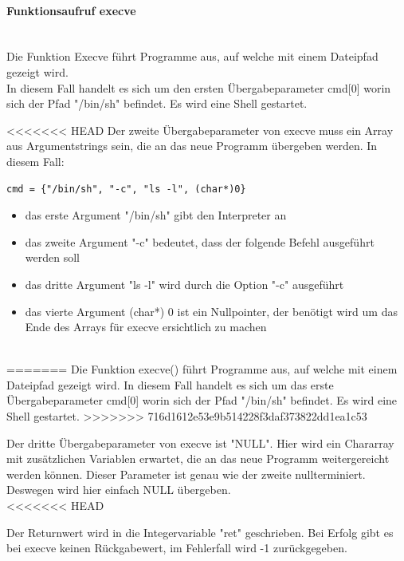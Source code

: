 \documentclass[12pt]{article}
\begin{document}
			\paragraph{Funktionsaufruf execve}
			~\\
			Die Funktion Execve f\"uhrt Programme aus, auf welche mit einem Dateipfad gezeigt wird.\\
			In diesem Fall handelt es sich um den ersten \"Ubergabeparameter cmd[0]
			worin sich der Pfad "/bin/sh" befindet. Es wird eine Shell gestartet.

<<<<<<< HEAD
			Der zweite \"Ubergabeparameter von execve muss ein Array aus Argumentstrings sein, die an das neue Programm \"ubergeben werden. In diesem Fall:

			\begin{lstlisting}
cmd = {"/bin/sh", "-c", "ls -l", (char*)0}
			\end{lstlisting}
			\begin{itemize}
			\item das erste Argument "/bin/sh" gibt den Interpreter an\\
			\item das zweite Argument "-c" bedeutet, dass der folgende Befehl ausgef\"uhrt werden soll\\
			\item das dritte Argument "ls -l" wird durch die Option "-c" ausgef\"uhrt\\
			\item das vierte Argument (char*) 0 ist ein Nullpointer, der ben\"otigt wird um das Ende des Arrays f\"ur execve ersichtlich zu machen
			\end{itemize}
			~\\[0.3cm]
=======
Die Funktion execve() führt Programme aus, auf welche mit einem Dateipfad gezeigt wird.
In diesem Fall handelt es sich um das erste Übergabeparameter cmd[0]
worin sich der Pfad "/bin/sh" befindet. Es wird eine Shell gestartet.
>>>>>>> 716d1612e53e9b514228f3daf373822dd1ea1c53

			Der dritte \"Ubergabeparameter von execve ist "NULL". Hier wird ein Chararray mit zus\"atzlichen Variablen erwartet, die an
das neue Programm weitergereicht werden k\"onnen. Dieser Parameter ist genau wie der zweite nullterminiert. Deswegen wird hier einfach NULL \"ubergeben.\\[0.3cm]

<<<<<<< HEAD

			Der Returnwert wird in die Integervariable "ret" geschrieben. Bei Erfolg gibt es bei execve keinen R\"uckgabewert, im Fehlerfall wird -1 zur\"uckgegeben.
\end{document}
